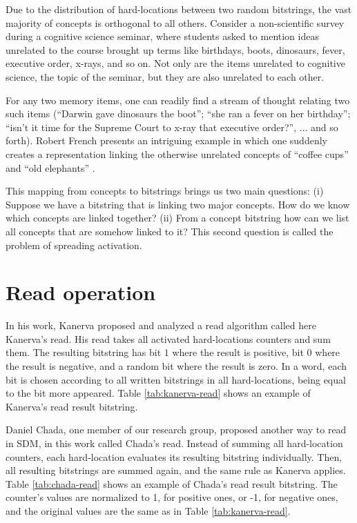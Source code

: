 Due to the distribution of hard-locations between two random bitstrings, the vast majority of concepts is orthogonal to all others. Consider a non-scientific survey during a cognitive science seminar, where students asked to mention ideas unrelated to the course brought up terms like birthdays, boots, dinosaurs, fever, executive order, x-rays, and so on. Not only are the items unrelated to cognitive science, the topic of the seminar, but they are also unrelated to each other.

For any two memory items, one can readily find a stream of thought relating two such items (``Darwin gave dinosaurs the boot''; ``she ran a fever on her birthday''; ``isn't it time for the Supreme Court to x-ray that executive order?'', ... and so forth). Robert French presents an intriguing example in which one suddenly creates a representation linking the otherwise unrelated concepts of ``coffee cups'' and ``old elephants'' \citep{French1997}.

This mapping from concepts to bitstrings brings us two main questions: (i) Suppose we have a bitstring that is linking two major concepts.  How do we know which concepts are linked together? (ii) From a concept bitstring how can we list all concepts that are somehow linked to it? This second question is called the problem of spreading activation.


\section{Read operation}

In his work, Kanerva proposed and analyzed a read algorithm called here Kanerva's read. His read takes all activated hard-locations counters and sum them. The resulting bitstring has bit $1$ where the result is positive, bit $0$ where the result is negative, and a random bit where the result is zero. In a word, each bit is chosen according to all written bitstrings in all hard-locations, being equal to the bit more appeared. Table \ref{tab:kanerva-read} shows an example of Kanerva's read result bitstring.

Daniel Chada, one member of our research group, proposed another way to read in SDM, in this work called Chada's read. Instead of summing all hard-location counters, each hard-location evaluates its resulting bitstring individually. Then, all resulting bitstrings are summed again, and the same rule as Kanerva applies. Table \ref{tab:chada-read} shows an example of Chada's read result bitstring. The counter's values are normalized to 1, for positive ones, or -1, for negative ones, and the original values are the same as in Table \ref{tab:kanerva-read}.


